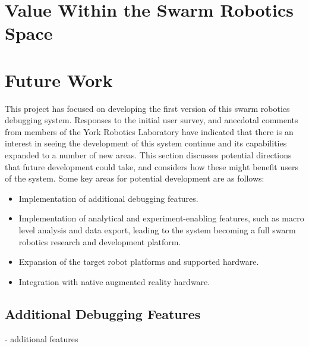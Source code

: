 
\section{Value Within the Swarm Robotics Space}



\section{Future Work} 

This project has focused on developing the first version of this swarm robotics debugging system. Responses to the initial user survey, and anecdotal comments from members of the York Robotics Laboratory have indicated that there is an interest in seeing the development of this system continue and its capabilities expanded to a number of new areas. This section discusses potential directions that future development could take, and considers how these might benefit users of the system. Some key areas for potential development are as follows:

\begin{itemize}
 \item Implementation of additional debugging features.
 \item Implementation of analytical and experiment-enabling features, such as macro level analysis and data export, leading to the system becoming a full swarm robotics research and development platform.
 \item Expansion of the target robot platforms and supported hardware.
 \item Integration with native augmented reality hardware.
\end{itemize}


\subsection{Additional Debugging Features}

- additional features

